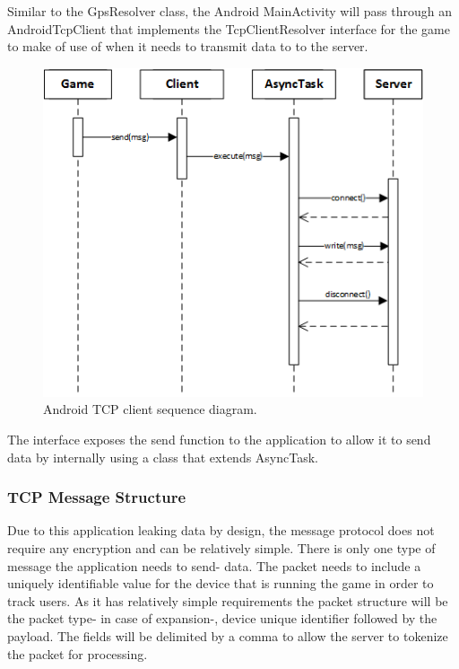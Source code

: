 Similar to the GpsResolver class, the Android MainActivity will pass through an AndroidTcpClient that implements the TcpClientResolver interface for the game to make of use of when it needs to transmit data to to the server.

\begin{figure}[h!]
\centering\includegraphics[width=\linewidth]{design/figures/tcp-client-sd.png}
\caption{Android TCP client sequence diagram.}
\end{figure}

The interface exposes the send function to the application to allow it to send data by internally using a class that extends AsyncTask.
\newpage
\subsubsection{TCP Message Structure}
\label{design:tcp-structure}
Due to this application leaking data by design, the message protocol does not require any encryption and can be relatively simple. There is only one type of message the application needs to send- data. The packet needs to include a uniquely identifiable value for the device that is running the game in order to track users. As it has relatively simple requirements the packet structure will be the packet type- in case of expansion-, device unique identifier followed by the payload. The fields will be delimited by a comma to allow the server to tokenize the packet for processing.

